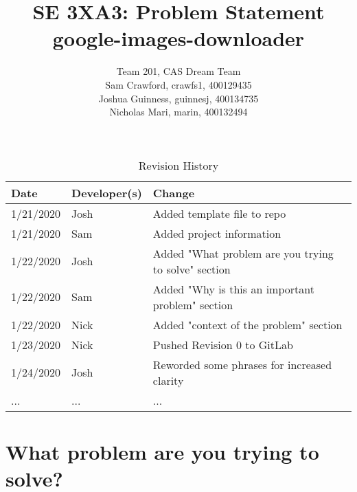 \documentclass{article}
\title{SE 3XA3: Problem Statement\\google-images-downloader}
\author{Team 201, CAS Dream Team
		\\ Sam Crawford, crawfs1, 400129435
		\\ Joshua Guinness, guinnesj, 400134735
		\\ Nicholas Mari, marin, 400132494
}
\date{}
\begin{document}
\begin{table}[h]
\caption{Revision History} \label{TblRevisionHistory}
\begin{tabularx}{\textwidth}{llX}
\toprule
\textbf{Date} & \textbf{Developer(s)} & \textbf{Change}\\
\midrule
1/21/2020 & Josh & Added template file to repo\\
1/21/2020 & Sam & Added project information\\
1/22/2020 & Josh & Added "What problem are you trying to solve" section\\
1/22/2020 & Sam & Added "Why is this an important problem" section\\
1/22/2020 & Nick & Added "context of the problem" section\\
1/23/2020 & Nick & Pushed Revision 0 to GitLab\\
1/24/2020 & Josh & Reworded some phrases for increased clarity\\
... & ... & ...\\
\bottomrule
\end{tabularx}
\end{table}

\newpage

\maketitle

\section* {What problem are you trying to solve?}
\end{document}
